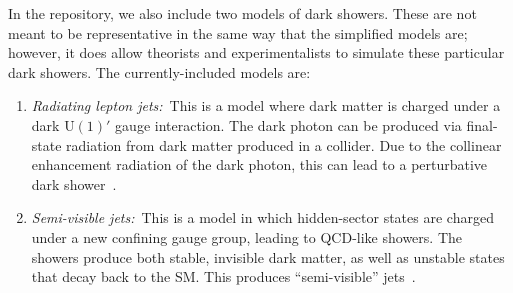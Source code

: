 In the repository, we also include two models of dark showers. These are not meant to be representative in the same way that the simplified models are; however, it does allow theorists and experimentalists to simulate these particular dark showers. The currently-included models are:
%
\begin{enumerate}

\item \emph{Radiating lepton jets:}~This is a model where dark matter is charged under a dark $\mathrm{U}(1)'$ gauge interaction. The dark photon can be produced via final-state radiation from dark matter produced in a collider. Due to the collinear enhancement radiation of the dark photon, this can lead to a perturbative dark shower~\cite{Buschmann:2015awa}.

\item \emph{Semi-visible jets:}~This is a model in which hidden-sector states are charged under a new confining gauge group, leading to QCD-like showers. The showers produce both stable, invisible dark matter, as well as unstable states that decay back to the SM. This produces ``semi-visible'' jets~\cite{Cohen:2015toa,Cohen:2017pzm}.

\end{enumerate}
